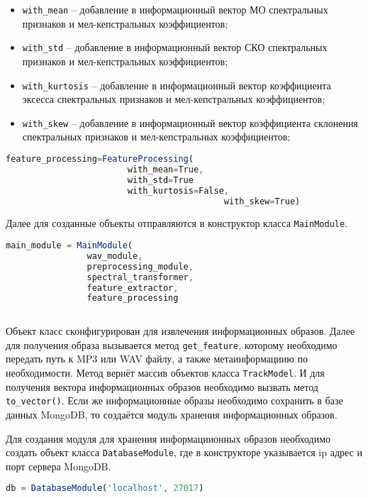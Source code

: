 \begin{itemize} 
\item \texttt{with\_mean} -- добавление в информационный вектор МО спектральных признаков и мел-кепстральных коэффициентов;
\item \texttt{with\_std}  -- добавление в информационный вектор СКО спектральных признаков и мел-кепстральных коэффициентов;
\item \texttt{with\_kurtosis}  -- добавление в информационный вектор коэффициента эксесса спектральных признаков и мел-кепстральных коэффициентов;
\item \texttt{with\_skew} -- добавление в информационный вектор коэффициента склонения спектральных признаков и мел-кепстральных коэффициентов;
\end{itemize}

\begin{lstlisting}[language=TypeScript, label=lst:testing:results]
        feature_processing=FeatureProcessing(
        				with_mean=True,
        				with_std=True
        				with_kurtosis=False,
                                           with_skew=True)
\end{lstlisting}



Далее для созданные объекты отправляются в конструктор класса \texttt{MainModule}.


\begin{lstlisting}[language=TypeScript, label=lst:testing:results]
	main_module = MainModule( 
				wav_module,
				preprocessing_module,
				spectral_transformer,
				feature_extractor,
				feature_processing
				 
\end{lstlisting}

Объект класс сконфигурирован для извлечения информационных образов. Далее для получения образа вызывается  метод \texttt{get\_feature}, которому необходимо передать путь к MP3 или WAV файлу, а также метаинформациию по необходимости. Метод вернёт массив объектов класса \texttt{TrackModel}. И для получения вектора информационных образов необходимо вызвать метод \texttt{to\_vector()}. Если же информационные образы необходимо сохранить в базе данных MongoDB, то создаётся модуль хранения информационных образов.

Для создания модуля для хранения информациионных образов необходимо создать объект класса \texttt{DatabaseModule},  где в конструкторе указывается ip адрес и порт сервера MongoDB.

\begin{lstlisting}[language=TypeScript, label=lst:testing:results]
	db = DatabaseModule('localhost', 27017)
\end{lstlisting}

